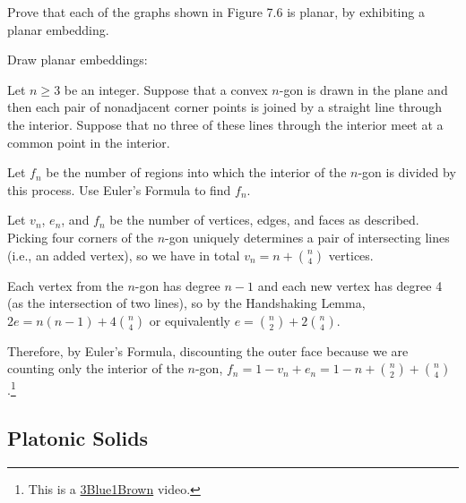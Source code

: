 \documentclass[class=math239,notes,tikz]{agony}
\begin{document}
\begin{xca}
  Prove that each of the graphs shown in Figure 7.6 is planar,
  by exhibiting a planar embedding.
\end{xca}
\begin{sol}
  Draw planar embeddings:
  \quad
\end{sol}

\begin{xca}
  Let $n \geq 3$ be an integer.
  Suppose that a convex $n$-gon is drawn in the plane
  and then each pair of nonadjacent corner points
  is joined by a straight line through the interior.
  Suppose that no three of these lines through the interior
  meet at a common point in the interior.

  Let $f_n$ be the number of regions into which
  the interior of the $n$-gon is divided by this process.
  Use Euler's Formula to find $f_n$.
\end{xca}
\begin{sol}
  Let $v_n$, $e_n$, and $f_n$ be the number of vertices, edges, and faces as described.
  Picking four corners of the $n$-gon uniquely determines
  a pair of intersecting lines (i.e., an added vertex),
  so we have in total $v_n = n + \binom{n}{4}$ vertices.

  Each vertex from the $n$-gon has degree $n-1$
  and each new vertex has degree 4 (as the intersection of two lines),
  so by the Handshaking Lemma, $2e = n(n-1) + 4\binom{n}{4}$
  or equivalently $e = \binom{n}{2} + 2\binom{n}{4}$.

  Therefore, by Euler's Formula, discounting the outer face because
  we are counting only the interior of the $n$-gon, $f_n = 1 - v_n + e_n
    = 1 - n + \binom{n}{2} + \binom{n}{4}$.\footnote{This is a \href{https://www.youtube.com/watch?v=K8P8uFahAgc}{3Blue1Brown} video.}
\end{sol}

\subsection{Platonic Solids}
\end{document}
